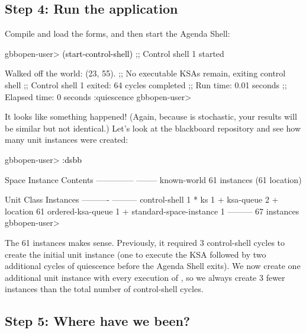 \documentclass[10pt,twoside,english,pdftex]{article}
\begin{document}
\subsection*{Step 4:  Run the application}

%
%
Compile and load the  forms, and then start the Agenda
Shell:
%
\W\supp
\begin{example}
\textcolor{darkergray}{%
  gbbopen-user> \textcolor{black}{(start-control-shell)}
  ;; Control shell 1 started

  Walked off the world: (23, 55).
  ;; No executable KSAs remain, exiting control shell
  ;; Control shell 1 exited: 64 cycles completed
  ;; Run time: 0.01 seconds
  ;; Elapsed time: 0 seconds
  :quiescence
  gbbopen-user>}
\end{example}

%
%
It looks like something happened! (Again, because 
is stochastic, your results will be similar but not identical.)  Let's look at
the blackboard repository and see how many  unit instances were
created:
%
\W\supp
\begin{example}
\textcolor{darkergray}{%
  gbbopen-user> \textcolor{black}{:dsbb}

  Space Instance                Contents
  --------------                --------
  known-world                   61 instances (61 location)

  Unit Class                    Instances
  ----------                    ---------
  control-shell                         1 *
  ks                                    1 +
  ksa-queue                             2 +
  location                             61
  ordered-ksa-queue                     1 +
  standard-space-instance               1
                                ---------
                                       67 instances
  gbbopen-user>}
\end{example}

The 61  instances makes sense.  Previously, it required 3
control-shell cycles to create the initial  unit instance (one
to execute the  KSA followed by two additional cycles of
quiescence before the Agenda Shell exits).  We now create one additional
 unit instance with every execution of ,
so we always create 3 fewer  instances than the total
number of control-shell cycles.

\subsection*{Step 5:  Where have we been?}
\end{document}
